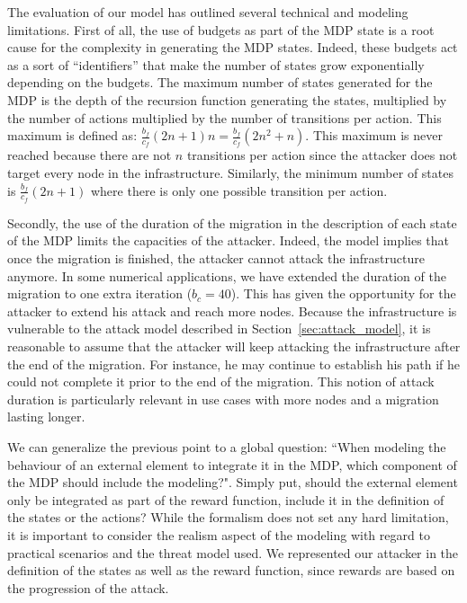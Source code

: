 \label{sec:mdp-discussion}
The evaluation of our model has outlined several technical and modeling limitations.
First of all, the use of budgets as part of the MDP state is a root cause for the complexity in generating the MDP states. Indeed, these budgets act as a sort of ``identifiers'' that make the number of states grow exponentially depending on the budgets. The maximum number of states generated for the MDP is the depth of the recursion function generating the states, multiplied by the number of actions multiplied by the number of transitions per action. This maximum is defined as: $\frac{b_f}{c_f}(2n+1)n = \frac{b_f}{c_f}(2n^2+n)$. This maximum is never reached because there are not $n$ transitions per action since the attacker does not target every node in the infrastructure. Similarly, the minimum number of states is $\frac{b_f}{c_f}(2n+1)$ where there is only one possible transition per action. 

Secondly, the use of the duration of the migration in the description of each state of the MDP limits the capacities of the attacker. Indeed, the model implies that once the migration is finished, the attacker cannot attack the infrastructure anymore. 
In some numerical applications, we have extended the duration of the migration to one extra iteration ($b_c = 40$). This has given the opportunity for the attacker to extend his attack and reach more nodes.
Because the infrastructure is vulnerable to the attack model described in Section~\ref{sec:attack_model}, it is reasonable to assume that the attacker will keep attacking the infrastructure after the end of the migration. For instance, he may continue to establish his path if he could not complete it prior to the end of the migration. This notion of attack duration is particularly relevant in use cases with more nodes and a migration lasting longer.

We can generalize the previous point to a global question: ``When modeling the behaviour of an external element to integrate it in the MDP, which component of the MDP should include the modeling?". Simply put, should the external element only be integrated as part of the reward function, include it in the definition of the states or the actions? While the formalism does not set any hard limitation, it is important to consider the realism aspect of the modeling with regard to practical scenarios and the threat model used. We represented our attacker in the definition of the states as well as the reward function, since rewards are based on the progression of the attack.



